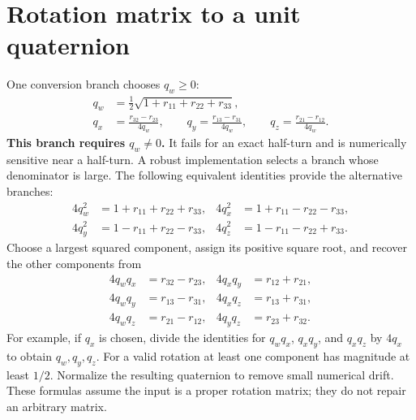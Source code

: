 \clearpage
\section*{Rotation matrix to a unit quaternion}
One conversion branch chooses $q_w\ge0$:
\[
 \begin{aligned}
 q_w&=\tfrac12\sqrt{1+r_{11}+r_{22}+r_{33}},\\
 q_x&=\frac{r_{32}-r_{23}}{4q_w},\qquad
 q_y=\frac{r_{13}-r_{31}}{4q_w},\qquad
 q_z=\frac{r_{21}-r_{12}}{4q_w}.
 \end{aligned}
\]
\textbf{This branch requires $q_w\ne0$.} It fails for an exact half-turn
and is numerically sensitive near a half-turn. A robust implementation selects
a branch whose denominator is large. The following equivalent identities
provide the alternative branches:
\[
 \begin{aligned}
 4q_w^2&=1+r_{11}+r_{22}+r_{33},&
 4q_x^2&=1+r_{11}-r_{22}-r_{33},\\
 4q_y^2&=1-r_{11}+r_{22}-r_{33},&
 4q_z^2&=1-r_{11}-r_{22}+r_{33}.
 \end{aligned}
\]
Choose a largest squared component, assign its positive square root, and
recover the other components from
\[
 \begin{aligned}
 4q_wq_x&=r_{32}-r_{23},&4q_xq_y&=r_{12}+r_{21},\\
 4q_wq_y&=r_{13}-r_{31},&4q_xq_z&=r_{13}+r_{31},\\
 4q_wq_z&=r_{21}-r_{12},&4q_yq_z&=r_{23}+r_{32}.
 \end{aligned}
\]
For example, if $q_x$ is chosen, divide the identities for $q_wq_x$,
$q_xq_y$, and $q_xq_z$ by $4q_x$ to obtain $q_w,q_y,q_z$. For a valid
rotation at least one component has magnitude at least $1/2$. Normalize
the resulting quaternion to remove small numerical drift. These formulas
assume the input is a proper rotation matrix; they do not repair an arbitrary matrix.
\par
\endgroup
